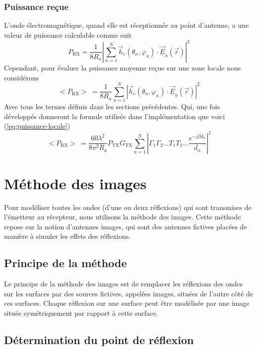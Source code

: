 \subsubsection*{Puissance reçue}
L'onde {\'e}lectromagn{\'e}tique, quand elle est r{\'e}ceptionn{\'e}e au point
d'antenne, a une valeur de puissance calculable
comme suit
\[ P_{\mathrm{RX}} = \frac{1}{8 R_a} \left| \sum_{n = 1}^N \vec{h}_e (\theta_n,
   \varphi_n) \cdot \overrightarrow{\underline{E}}_n (\vec{r}) \right|^2 \]
Cependant, pour {\'e}valuer la puissance moyenne re{\c c}ue sur une zone locale nous considérons 
\[ < P_{\mathrm{RX}} >\ = \frac{1}{8 R_a} \sum_{n = 1}^N \left| \vec{h}_e (\theta_n,
   \varphi_n) \cdot \overrightarrow{\underline{E}}_n (\vec{r}) \right|^2 \]
Avec tous les termes d{\'e}finis dans les sections pr{\'e}c{\'e}dentes. Qui, une fois développés donneront la formule utilisée dans l'implémentation que voici
(\ref{eq:puissance-locale})
\begin{equation}
\label{eq:puissance-locale}
    <P_{\mathrm{RX}}>\ = \frac{60 \lambda^2}{8 \pi^2 R_a}P_{\mathrm{TX}}G_{\mathrm{TX}}\sum_{n=1}^N \left| \Gamma_1 \Gamma_2 \dotsc T_1 T_2 \dotsc \frac{e^{-j \beta d_n}}{d_n} \right|^2
\end{equation}
\section{M{\'e}thode des images}

Pour mod{\'e}liser toutes les ondes (d'une ou deux r{\'e}flexions) qui sont
transmises de l'émetteur au récepteur, nous utilisons la
m{\'e}thode des images. Cette m{\'e}thode repose sur la notion d'antennes
images, qui sont des antennes fictives plac{\'e}es de mani{\`e}re {\`a}
simuler les effets des r{\'e}flexions.

\subsection{Principe de la m{\'e}thode}

Le principe de la m{\'e}thode des images est de remplacer les r{\'e}flexions
des ondes sur les surfaces par des sources fictives, appel{\'e}es images,
situ{\'e}es de l'autre c{\^o}t{\'e} de ces surfaces. Chaque r{\'e}flexion sur
une surface peut {\^e}tre mod{\'e}lis{\'e}e par une image situ{\'e}e
sym{\'e}triquement par rapport {\`a} cette surface.

\subsection{D{\'e}termination du point de r{\'e}flexion}

